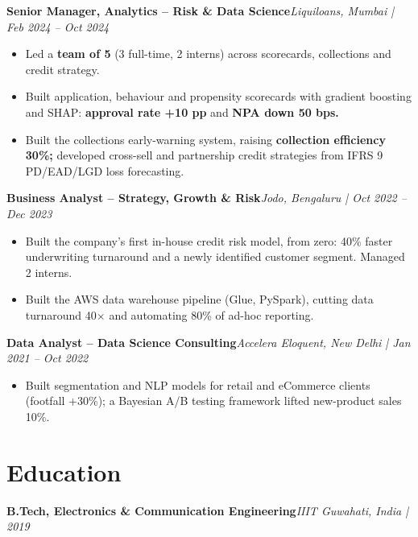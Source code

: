 \documentclass[10pt,a4paper]{article}
\newcommand{\role}[2]{\vspace{3pt}\textbf{#1}\hfill\textit{#2}\par}
\begin{document}
\role{Senior Manager, Analytics -- Risk \& Data Science}{Liquiloans, Mumbai | Feb 2024 -- Oct 2024}
\begin{itemize}
  \item Led a \textbf{team of 5} (3 full-time, 2 interns) across scorecards, collections and credit strategy.
  \item Built application, behaviour and propensity scorecards with gradient boosting and SHAP: \textbf{approval rate +10 pp} and \textbf{NPA down 50 bps.}
  \item Built the collections early-warning system, raising \textbf{collection efficiency 30\%;} developed cross-sell and partnership credit strategies from IFRS 9 PD/EAD/LGD loss forecasting.
\end{itemize}
\role{Business Analyst -- Strategy, Growth \& Risk}{Jodo, Bengaluru | Oct 2022 -- Dec 2023}
\begin{itemize}
  \item Built the company's first in-house credit risk model, from zero: 40\% faster underwriting turnaround and a newly identified customer segment. Managed 2 interns.
  \item Built the AWS data warehouse pipeline (Glue, PySpark), cutting data turnaround 40$\times$ and automating 80\% of ad-hoc reporting.
\end{itemize}
\role{Data Analyst -- Data Science Consulting}{Accelera Eloquent, New Delhi | Jan 2021 -- Oct 2022}
\begin{itemize}
  \item Built segmentation and NLP models for retail and eCommerce clients (footfall +30\%); a Bayesian A/B testing framework lifted new-product sales 10\%.
\end{itemize}
\section{Education}
\textbf{B.Tech, Electronics \& Communication Engineering}\hfill\textit{IIIT Guwahati, India | 2019}\par
\end{document}

